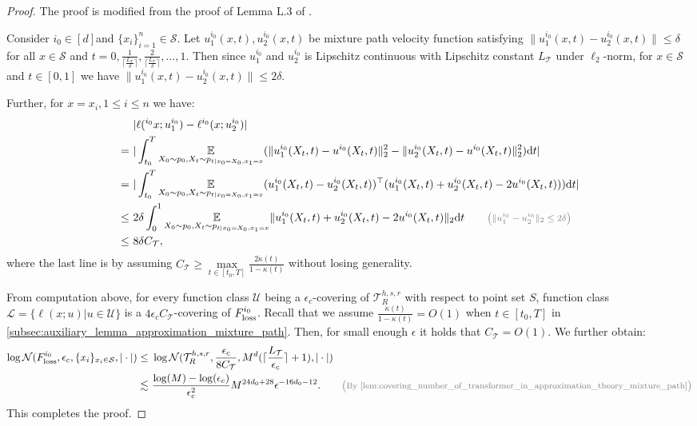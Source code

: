\documentclass[12pt]{article}
\numberwithin{equation}{section}
\DeclareMathOperator*{\E}{{\mathbb{E}}}
\def\E{\mathbb{E}}
\let\cite\citep
\theoremstyle{theoremstyle}
\numberwithin{equation}{section}
\numberwithin{theorem}{section}
\numberwithin{proposition}{section}
\numberwithin{definition}{section}
\numberwithin{lemma}{section}
\numberwithin{assumption}{section}
\numberwithin{remark}{section}
\newcommand*{\annot}[1]{\tag*{\footnotesize{\textcolor{black!50}{\big(#1\big)}}}}
\begin{document}
\begin{proof}
The proof is modified from the proof of Lemma L.3 of \cite{su2025high}.

Consider $i_0\in[d]$and $\{x_i\}_{i=1}^n\in \mathcal{S}$.
Let $u^{i_0}_1(x,t),u^{i_0}_2(x,t)$ be mixture path velocity function satisfying $\|u^{i_0}_1(x,t)-u^{i_0}_2(x,t)\|\leq \delta$ for all $x\in \mathcal{S}$ and $t=0,\frac{1}{\lceil\frac{L_\mathcal{T}}{\delta}\rceil},\frac{2}{\lceil\frac{L_\mathcal{T}}{\delta}\rceil},\dots,1$.
Then since $u^{i_0}_1$ and $u^{i_0}_2$ is Lipschitz continuous with Lipschitz constant $L_{\mathcal{T}}$ under $\ell_2$-norm, for $x\in \mathcal{S}$ and $t\in[0,1]$ we have $\|u^{i_0}_1(x,t)-u^{i_0}_2(x,t)\|\leq 2\delta$.

Further, for $x=x_i,1\leq i\leq n$ we have: 
\begin{align*}
    & ~|\ell(^{i_0}x;u^{i_0}_1)-\ell^{i_0}(x;u^{i_0}_2)| \\
    = & ~
    |\int_{t_0}^T \underset{X_0\sim p_0,X_t\sim p_{t|x_0=X_0,x_1=x}}{\E}(\|u^{i_0}_1(X_t,t)-u^{i_0}(X_t,t)\|_2^2- 
    \|u^{i_0}_2(X_t,t)-u^{i_0}(X_t,t)\|_2^2) \dd t| \\
    = & ~
    |\int_{t_0}^T \underset{X_0\sim p_0,X_t\sim p_{t|x_0=X_0,x_1=x}}{\E}(u^{i_0}_1(X_t,t)-u^{i_0}_2(X_t,t))^\top(u^{i_0}_1(X_t,t)+u^{i_0}_2(X_t,t)-2u^{i_0}(X_t,t))) \dd t|\\
    \leq & ~
    2\delta \int_0^1 \underset{X_0\sim p_0,X_t\sim p_{t|x_0=X_0,x_1=x}}{\E}\|u^{i_0}_1(X_t,t)+u^{i_0}_2(X_t,t)-2u^{i_0}(X_t,t)\|_2 \dd t \annot{$\|u^{i_0}_1-u^{i_0}_2\|_2\leq2\delta$}\\
    \leq & ~
    8\delta C_\mathcal{T},            
\end{align*}
where the last line is by assuming $C_\mathcal{T}\geq \underset{t\in[t_0,T]}{\max}\frac{2\dot{\kappa}(t)}{1-\kappa(t)}$ without losing generality.

From computation above, for every function class $\mathcal{U}$ being a $\epsilon_c$-covering of $\mathcal{T}^{h,s,r}_R$ with respect to point set $S$, function class $\mathcal{L}=\{\ell(x;u)|u\in\mathcal{U}\}$ is a $4\epsilon_cC_\mathcal{T}$-covering of $F^{i_0}_{\rm loss}$.
Recall that we assume $\frac{\dot{\kappa}(t)}{1-\kappa(t)}=O(1)$ when $t\in[t_0,T]$ in \cref{subsec:auxiliary_lemma_approximation_mixture_path}.
Then, for small enough $\epsilon$ it holds that $C_\mathcal{T}=O(1)$.
We further obtain:
\begin{align*}
    \log\mathcal{N}(F^{i_0}_{\rm loss},\epsilon_c,\{x_i\}_{x_i\in \mathcal{S}},|\cdot|)\leq & ~
    \log\mathcal{N}(\mathcal{T}^{h,s,r}_R,\frac{\epsilon_c}{8C_\mathcal{T}},M^d(\lceil\frac{L_\mathcal{T}}{\epsilon_c}\rceil+1),|\cdot|) \\
    \lesssim & ~
    \frac{\log(M)-\log(\epsilon_c)}{\epsilon_c^2}M^{24d_0+28}\epsilon^{-16d_0-12}. \annot{By \cref{lem:covering_number_of_transformer_in_approximation_theory_mixture_path}}
\end{align*}
This completes the proof.
\end{proof}
\end{document}
